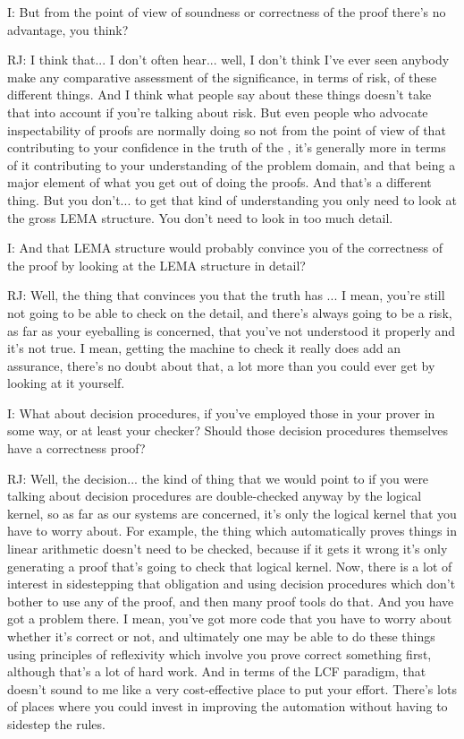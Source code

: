 \documentclass[10pt,titlepage]{book}
\begin{document}
I: But from the point of view of soundness or correctness of the proof there's no advantage, you think?

RJ: I think that... I don't often hear... well, I don't think I've ever seen anybody make any comparative assessment of the significance, in terms of risk, of these different things. And I think what people say about these things doesn't take that into account if you're talking about risk. But even people who advocate inspectability of proofs are normally doing so not from the point of view of that contributing to your confidence in the truth of the 	, it's generally more in terms of it contributing to your understanding of the problem domain, and that being a major element of what you get out of doing the proofs. And that's a different thing. But you don't... to get that kind of understanding you only need to look at the gross LEMA structure. You don't need to look in too much detail.

I: And that LEMA structure would probably convince you of the correctness of the proof by looking at the LEMA structure in detail?

RJ: Well, the thing that convinces you that the truth has		... I mean, you're still not going to be able to check on the detail, and there's always going to be a risk, as far as your eyeballing is concerned, that you've not understood it properly and it's not true. I mean, getting the machine to check it really does add an assurance, there's no doubt about that, a lot more than you could ever get by looking at it yourself.

I: What about decision procedures, if you've employed those in your prover in some way, or at least your checker? Should those decision procedures themselves have a correctness proof?

RJ: Well, the decision... the kind of thing that we would point to if you were talking about decision procedures are double-checked anyway by the logical kernel, so as far as our systems are concerned, it's only the logical kernel that you have to worry about. For example, the thing which automatically proves things in linear arithmetic doesn't need to be checked, because if it gets it wrong it's only generating a proof that's going to check that logical kernel. Now, there is a lot of interest in sidestepping that obligation and using decision procedures which don't bother to use any of the proof, and then many proof tools do that. And you have got a problem there. I mean, you've got more code that you have to worry about whether it's correct or not, and ultimately one may be able to do these things using principles of reflexivity which involve you prove correct something first, although that's a lot of hard work. And in terms of the LCF paradigm, that doesn't sound to me like a very cost-effective place to put your effort. There's lots of places where you could invest in improving the automation without having to sidestep the 	rules.
\end{document}
